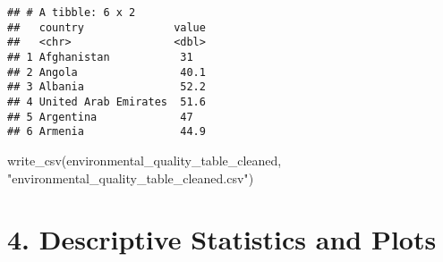 \documentclass[
]{article}
\newenvironment{Shaded}{\begin{snugshade}}{\end{snugshade}}
\newcommand{\FunctionTok}[1]{\textcolor[rgb]{0.00,0.00,0.00}{#1}}
\newcommand{\NormalTok}[1]{#1}
\newcommand{\StringTok}[1]{\textcolor[rgb]{0.31,0.60,0.02}{#1}}
\begin{document}
\begin{verbatim}
## # A tibble: 6 x 2
##   country              value
##   <chr>                <dbl>
## 1 Afghanistan           31  
## 2 Angola                40.1
## 3 Albania               52.2
## 4 United Arab Emirates  51.6
## 5 Argentina             47  
## 6 Armenia               44.9
\end{verbatim}

\begin{Shaded}
\begin{Highlighting}[]
\FunctionTok{write\_csv}\NormalTok{(environmental\_quality\_table\_cleaned, }\StringTok{"environmental\_quality\_table\_cleaned.csv"}\NormalTok{)}
\end{Highlighting}
\end{Shaded}

\hypertarget{descriptive-statistics-and-plots}{%
\section{4. Descriptive Statistics and
Plots}\label{descriptive-statistics-and-plots}}
\end{document}
